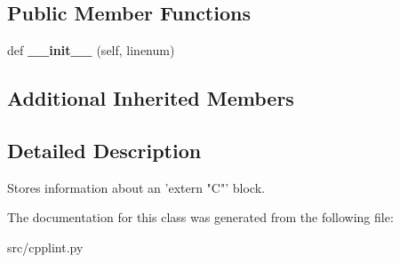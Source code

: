 \subsection*{Public Member Functions}
\begin{DoxyCompactItemize}
\item 
def {\bfseries \+\_\+\+\_\+init\+\_\+\+\_\+} (self, linenum)\hypertarget{classcpplint_1_1__ExternCInfo_a903a8aefdb01fd5be044f920ea110d0a}{}\label{classcpplint_1_1__ExternCInfo_a903a8aefdb01fd5be044f920ea110d0a}

\end{DoxyCompactItemize}
\subsection*{Additional Inherited Members}


\subsection{Detailed Description}
\begin{DoxyVerb}Stores information about an 'extern "C"' block.\end{DoxyVerb}
 

The documentation for this class was generated from the following file\+:\begin{DoxyCompactItemize}
\item 
src/cpplint.\+py\end{DoxyCompactItemize}
